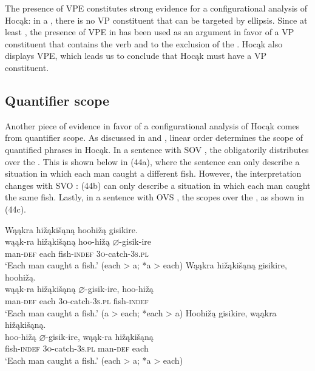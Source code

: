 \documentclass[output=paper]{LSP/langsci}
\begin{document}
 
The presence of VPE constitutes strong evidence for a configurational analysis of Hocąk: in a , there is no VP constituent that can be targeted by ellipsis. Since at least \citet{Ross1969}, the presence of VPE in  has been used as an argument in favor of a VP constituent that contains the verb and  to the exclusion of the . Hocąk also displays VPE, which leads us to conclude that Hocąk must have a VP constituent.
 

\subsection{Quantifier scope}

 
Another piece of evidence in favor of a configurational analysis of Hocąk comes from quantifier scope. As discussed in \citet{Johnson2014} and \citet{JohnsonRosen2014}, linear order determines the scope of quantified phrases in Hocąk. In a sentence with SOV , the  obligatorily distributes over the . This is shown below in (44a), where the sentence can only describe a situation in which each man caught a different fish. However, the interpretation changes with SVO : (44b) can only describe a situation in which each man caught the same fish. Lastly, in a sentence with OVS , the  scopes over the , as shown in (44c).
 

\begin{exe}
\ex\label{ex:jrs:44}
\begin{xlist}
\ex 
\glll Wąąkra	hi\v{z}ąki\v{s}ąną		hoohi\v{z}ą	gisikire.\\
wąąk-ra		hi\v{z}ąki\v{s}ąną		hoo-hi\v{z}ą	$\varnothing$-gisik-ire \\
		man-\textsc{def}		each					fish-\textsc{indef}		\textsc{3o}-catch-\textsc{3s.pl} \\
\trans `Each man caught a fish.' (each > a; *a > each)
\ex 
\glll Wąąkra		hi\v{z}ąki\v{s}ąną		gisikire,			hoohi\v{z}ą.\\
wąąk-ra		hi\v{z}ąki\v{s}ąną		$\varnothing$-gisik-ire,	hoo-hi\v{z}ą \\
		man-\textsc{def}		each					\textsc{3o}-catch-\textsc{3s.pl}		fish-\textsc{indef} \\
\trans `Each man caught a fish.'  (a > each; *each > a)
\ex 
\glll Hoohi\v{z}ą	gisikire,	wąąkra	 hi\v{z}ąki\v{s}ąną.\\
hoo-hi\v{z}ą	$\varnothing$-gisik-ire,		wąąk-ra	hi\v{z}ąki\v{s}ąną \\
		fish-\textsc{indef}		\textsc{3o}-catch-\textsc{3s.pl}		man-\textsc{def}		each \\
\trans `Each man caught a fish.' (each > a; *a > each)
\end{xlist}
\end{exe}
\end{document}
